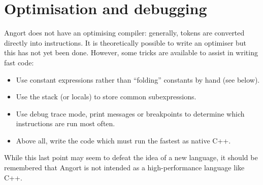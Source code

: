 \section{Optimisation and debugging}
Angort does not have an optimising compiler: generally, tokens are converted
directly into instructions. It is theoretically possible to write an
optimiser but this has not yet been done. However, some tricks are available
to assist in writing fast code:
\begin{itemize}
\item Use constant expressions rather than ``folding'' constants by
hand (see below).
\item Use the stack (or locals) to store common subexpressions.
\item Use debug trace mode, print messages or breakpoints
to determine which instructions are run most often.
\item Above all, write the code which must run the fastest as native C++.
\end{itemize}
While this last point may seem to defeat the idea of a new language, it
should be remembered that Angort is not intended as a high-performance
language like C++.

